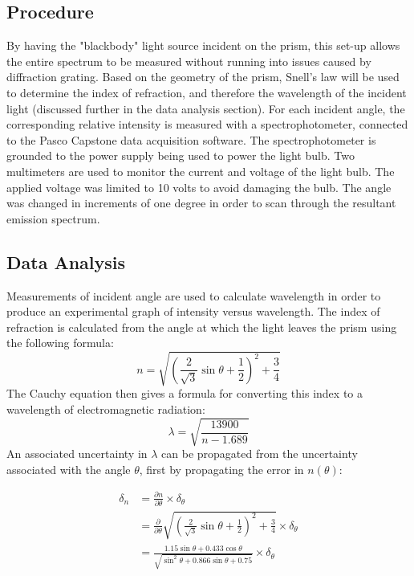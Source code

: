 \documentclass[a4paper]{article}
\begin{document}
\subsection{Procedure}

\qq By having the "blackbody" light source incident on the prism, this set-up allows the entire spectrum to be measured without running into issues caused by diffraction grating. Based on the geometry of the prism, Snell's law will be used to determine the index of refraction, and therefore the wavelength of the incident light (discussed further in the data analysis section). For each incident angle, the corresponding relative intensity is measured with a spectrophotometer, connected to the Pasco Capstone data acquisition software. The spectrophotometer is grounded to the power supply being used to power the light bulb. Two multimeters are used to monitor the current and voltage of the light bulb. The applied voltage was limited to 10 volts to avoid damaging the bulb. The angle was changed in increments of one degree in order to scan through the resultant emission spectrum.

\subsection{Data Analysis}

Measurements of incident angle are used to calculate wavelength in order to produce an experimental graph of intensity versus wavelength. The index of refraction is calculated from the angle at which the light leaves the prism using the following formula:
$$
n = \sqrt{
		\left( \frac{2}{\sqrt{3}} \sin \theta 
			   + \frac{1}{2} 
		\right)^2
		+ \frac{3}{4}
	}
$$
The Cauchy equation then gives a formula for converting this index to a wavelength of electromagnetic radiation:
$$ \lambda = \sqrt{\frac{13900}{n-1.689}} $$
An associated uncertainty in $\lambda$ can be propagated from the uncertainty associated with the angle $\theta$, first by propagating the error in $n( \theta )$:

\begin{align*}
\delta_n &= \frac{\partial n}{\partial \theta} \times \delta_{\theta} \\
&= \frac{\partial}{\partial \theta}
   \sqrt{
		\left( \frac{2}{\sqrt{3}} \sin \theta 
			   + \frac{1}{2} 
		\right)^2
		+ \frac{3}{4}
	}
    \times \delta_{\theta} \\
&= \frac{1.15 \sin \theta + 0.433 \cos \theta}{\sqrt{\sin^2 \theta + 0.866 \sin \theta + 0.75}} 
   \times \delta_{\theta} \\
\end{align*}
\end{document}
